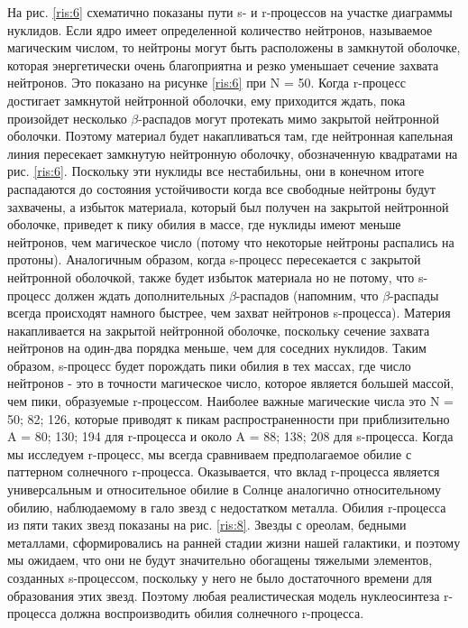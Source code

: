 \documentclass[%
master,    %
natbib,      %
subf,        %
href,        %
colorlinks,  %
]{disser}
\begin{document}
На рис. \ref{ris:6} схематично показаны пути s- и r-процессов на участке диаграммы нуклидов. Если ядро имеет определенной количество нейтронов, называемое магическим числом, то нейтроны могут быть расположены в замкнутой оболочке, которая энергетически очень благоприятна и резко уменьшает сечение захвата нейтронов. Это показано на рисунке \ref{ris:6} при N = 50. Когда r-процесс достигает замкнутой нейтронной оболочки, ему приходится ждать, пока произойдет несколько $\beta$-распадов могут протекать мимо закрытой нейтронной оболочки. Поэтому материал будет накапливаться там, где нейтронная капельная линия пересекает замкнутую нейтронную оболочку, обозначенную квадратами на рис. \ref{ris:6}. Поскольку эти нуклиды все нестабильны, они в конечном итоге распадаются до состояния устойчивости когда все свободные нейтроны будут захвачены, а избыток материала, который был получен на закрытой нейтронной оболочке, приведет к пику обилия в массе, где нуклиды имеют меньше нейтронов, чем магическое число (потому что некоторые нейтроны распались на протоны). Аналогичным образом, когда s-процесс пересекается с закрытой нейтронной оболочкой, также будет избыток материала но не потому, что s-процесс должен ждать дополнительных $\beta$-распадов (напомним, что $\beta$-распады всегда происходят намного быстрее, чем захват нейтронов s-процесса). Материя накапливается на закрытой нейтронной оболочке, поскольку сечение захвата нейтронов на один-два порядка меньше, чем для соседних нуклидов. Таким образом, s-процесс будет порождать пики обилия в тех массах, где число нейтронов - это в точности магическое число, которое является большей массой, чем пики, образуемые r-процессом. Наиболее важные магические числа это N = 50; 82; 126, которые приводят к пикам распространенности при приблизительно A = 80; 130; 194 для r-процесса и около A = 88; 138; 208 для s-процесса. Когда мы исследуем r-процесс, мы всегда сравниваем предполагаемое обилие с паттерном солнечного r-процесса. Оказывается, что вклад r-процесса является универсальным и относительное обилие в Солнце аналогично относительному обилию, наблюдаемому в гало звезд с недостатком металла. Обилия r-процесса из пяти таких звезд показаны на рис. \ref{ris:8}. Звезды с ореолам, бедными металлами, сформировались на ранней стадии жизни нашей галактики, и поэтому мы ожидаем, что они не будут значительно обогащены тяжелыми элементов, созданных s-процессом, поскольку у него не было достаточного времени для образования этих звезд. Поэтому любая реалистическая модель нуклеосинтеза r-процесса должна воспроизводить обилия солнечного r-процесса.
\end{document}

